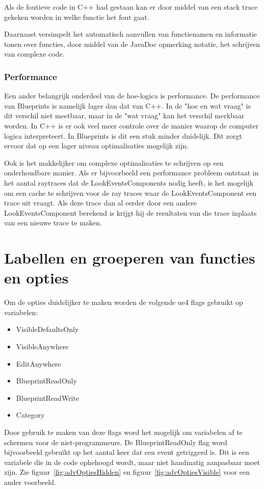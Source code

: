 Als de foutieve code in C++ had gestaan kan er door middel van een stack trace gekeken worden in welke functie het fout gaat.

Daarnaast versimpelt het automatisch aanvullen van functienamen en informatie tonen over functies, door middel van de JavaDoc opmerking notatie, het schrijven van complexe code.

\subsubsection{Performance}
Een ander belangrijk onderdeel van de hoe-logica is performance. De performance van Blueprints is namelijk lager dan dat van C++. In de "hoe en wat vraag" is dit verschil niet meetbaar, maar in de "wat vraag" kan het verschil merkbaar worden.
In C++ is er ook veel meer controle over de manier waarop de computer logica interpreteert. In Blueprints is dit een stuk minder duidelijk. Dit zorgt ervoor dat op een lager niveau optimalisaties mogelijk zijn. 

Ook is het makkelijker om complexe optimalisaties te schrijven op een onderhoudbare manier. Als er bijvoorbeeld een performance probleem ontstaat in het aantal raytraces dat de LookEventsComponents nodig heeft, is het mogelijk om een cache te schrijven voor de ray traces waar de LookEventsComponent een trace uit vraagt. Als deze trace dan al eerder door een andere LookEventsComponent berekend is krijgt hij de resultaten van die trace inplaats van een nieuwe trace te maken.

\section{Labellen en groeperen van functies en opties}
\label{sec:metadata}
Om de opties duidelijker te maken worden de volgende \gls{ue4} flags gebruikt op variabelen:

\begin{itemize}
	\item VisibleDefaultsOnly
	\item VisibleAnywhere
	\item EditAnywhere
	\item BlueprintReadOnly
	\item BlueprintReadWrite
	\item Category
\end{itemize}

Door gebruik te maken van deze flags word het mogelijk om variabelen af te schermen voor de niet-programmeurs. De BlueprintReadOnly flag word bijvoorbeeld gebruikt op het aantal keer dat een event getriggerd is. Dit is een variabele die in de code ophehoogd wordt, maar niet handmatig aanpasbaar moet zijn. Zie figuur~\ref{fig:advOptiesHidden} en figuur~\ref{fig:advOptiesVisible} voor een ander voorbeeld.

